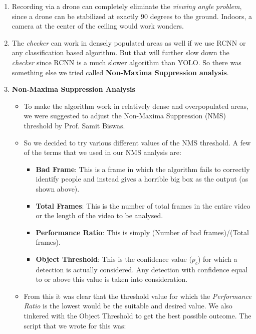 \documentclass[a4paper]{article}
\begin{document}
\begin{enumerate}
    \item Recording via a drone can completely eliminate the \textit{viewing angle problem}, since a drone can be stabilized at exactly 90 degrees to the ground. Indoors, a camera at the center of the ceiling would work wonders.
    \item The \textit{checker} can work in densely populated areas as well if we use RCNN or any classification based algorithm. But that will further slow down the \textit{checker} since RCNN is a much slower algorithm than YOLO. So there was something else we tried called \textbf{Non-Maxima Suppression analysis}.
    \pagebreak
    \item \textbf{Non-Maxima Suppression Analysis}
    \begin{itemize}
        \item To make the algorithm work in relatively dense and overpopulated areas, we were suggested to adjust the Non-Maxima Suppression (NMS) threshold by Prof. Samit Biswas. 
        \item So we decided to try various different values of the NMS threshold. A few of the terms that we used in our NMS analysis are:
        \begin{itemize}
            \item \textbf{Bad Frame}: This is a frame in which the algorithm fails to correctly identify people and instead gives a horrible big box as the output (as shown above).
            \item \textbf{Total Frames}: This is the number of total frames in the entire video or the length of the video to be analysed.
            \item \textbf{Performance Ratio}: This is simply (Number of bad frames)/(Total frames).
            \item \textbf{Object Threshold}: This is the confidence value ($p_c$) for which a detection is actually considered. Any detection with confidence equal to or above this value is taken into consideration.
        \end{itemize}
        \item From this it was clear that the threshold value for which the \textit{Performance Ratio} is the lowest would be the suitable and desired value. We also tinkered with the Object Threshold to get the best possible outcome. The script that we wrote for this was:
        

\end{itemize}
\end{enumerate}
\end{document}
